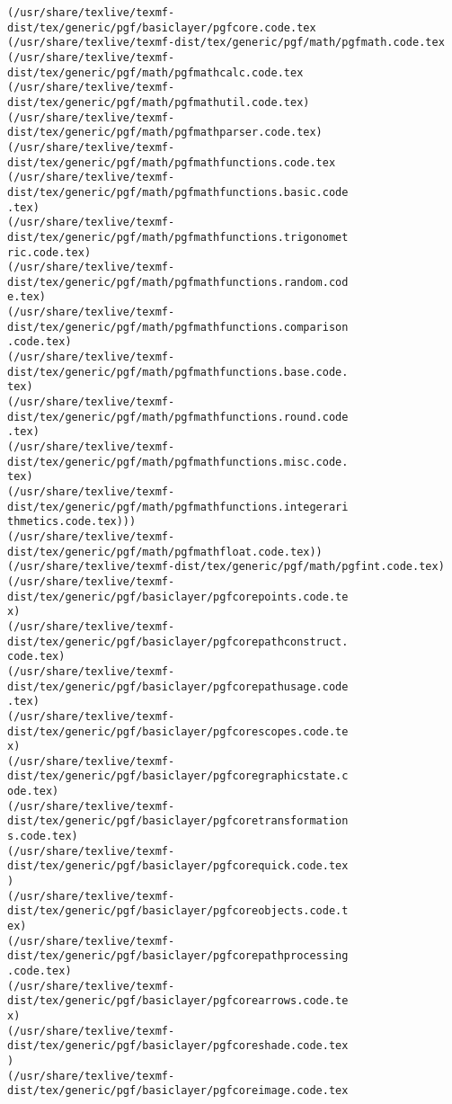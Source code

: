 \documentclass[11pt]{article}
\begin{document}
\begin{Verbatim}[commandchars=\\\{\}]
(/usr/share/texlive/texmf-dist/tex/generic/pgf/basiclayer/pgfcore.code.tex
(/usr/share/texlive/texmf-dist/tex/generic/pgf/math/pgfmath.code.tex
(/usr/share/texlive/texmf-dist/tex/generic/pgf/math/pgfmathcalc.code.tex
(/usr/share/texlive/texmf-dist/tex/generic/pgf/math/pgfmathutil.code.tex)
(/usr/share/texlive/texmf-dist/tex/generic/pgf/math/pgfmathparser.code.tex)
(/usr/share/texlive/texmf-dist/tex/generic/pgf/math/pgfmathfunctions.code.tex
(/usr/share/texlive/texmf-dist/tex/generic/pgf/math/pgfmathfunctions.basic.code
.tex)
(/usr/share/texlive/texmf-dist/tex/generic/pgf/math/pgfmathfunctions.trigonomet
ric.code.tex)
(/usr/share/texlive/texmf-dist/tex/generic/pgf/math/pgfmathfunctions.random.cod
e.tex)
(/usr/share/texlive/texmf-dist/tex/generic/pgf/math/pgfmathfunctions.comparison
.code.tex)
(/usr/share/texlive/texmf-dist/tex/generic/pgf/math/pgfmathfunctions.base.code.
tex)
(/usr/share/texlive/texmf-dist/tex/generic/pgf/math/pgfmathfunctions.round.code
.tex)
(/usr/share/texlive/texmf-dist/tex/generic/pgf/math/pgfmathfunctions.misc.code.
tex)
(/usr/share/texlive/texmf-dist/tex/generic/pgf/math/pgfmathfunctions.integerari
thmetics.code.tex)))
(/usr/share/texlive/texmf-dist/tex/generic/pgf/math/pgfmathfloat.code.tex))
(/usr/share/texlive/texmf-dist/tex/generic/pgf/math/pgfint.code.tex)
(/usr/share/texlive/texmf-dist/tex/generic/pgf/basiclayer/pgfcorepoints.code.te
x)
(/usr/share/texlive/texmf-dist/tex/generic/pgf/basiclayer/pgfcorepathconstruct.
code.tex)
(/usr/share/texlive/texmf-dist/tex/generic/pgf/basiclayer/pgfcorepathusage.code
.tex)
(/usr/share/texlive/texmf-dist/tex/generic/pgf/basiclayer/pgfcorescopes.code.te
x)
(/usr/share/texlive/texmf-dist/tex/generic/pgf/basiclayer/pgfcoregraphicstate.c
ode.tex)
(/usr/share/texlive/texmf-dist/tex/generic/pgf/basiclayer/pgfcoretransformation
s.code.tex)
(/usr/share/texlive/texmf-dist/tex/generic/pgf/basiclayer/pgfcorequick.code.tex
)
(/usr/share/texlive/texmf-dist/tex/generic/pgf/basiclayer/pgfcoreobjects.code.t
ex)
(/usr/share/texlive/texmf-dist/tex/generic/pgf/basiclayer/pgfcorepathprocessing
.code.tex)
(/usr/share/texlive/texmf-dist/tex/generic/pgf/basiclayer/pgfcorearrows.code.te
x)
(/usr/share/texlive/texmf-dist/tex/generic/pgf/basiclayer/pgfcoreshade.code.tex
)
(/usr/share/texlive/texmf-dist/tex/generic/pgf/basiclayer/pgfcoreimage.code.tex


\end{Verbatim}
\end{document}
